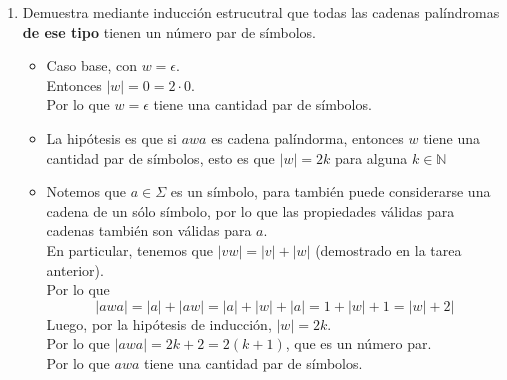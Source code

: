 \documentclass{article}
\begin{document}
\begin{enumerate}
{\begin{enumerate}
{\begin{itemize}
{                        }
                        \item {
                            Demostrar que $P(apa)$ es verdad usando la 
                            hipótesis del inciso anterior.
                        }
                    \end{itemize}
                }
                \item {
                    Demuestra mediante inducción estrucutral que todas las 
                    cadenas palíndromas \textbf{de ese tipo} tienen un número 
                    par de símbolos.
                    \begin{itemize}
                        \item {
                            Caso base, con $w = \epsilon$.\\
                            Entonces $|w| = 0 = 2\cdot 0$.\\
                            Por lo que $w = \epsilon$ tiene una cantidad par de 
                            símbolos.
                        }
                        \item {
                            La hipótesis es que si $awa$ es cadena palíndorma, 
                            entonces $w$ tiene una cantidad par de símbolos, 
                            esto es que $|w| = 2k$ para alguna $k \in \mathbb{N}$
                        }
                        \item {
                            Notemos que $a \in \Sigma$ es un símbolo, para 
                            también puede considerarse una cadena de un sólo 
                            símbolo, por lo que las propiedades válidas para 
                            cadenas también son válidas para $a$.\\
                            En particular, tenemos que $|vw| = |v| + |w|$ 
                            (demostrado en la tarea anterior).\\
                            Por lo que
                            \[|awa| = |a| + |aw| = |a| + |w| + |a| = 1 + |w| + 1
                            = |w| + 2|\]
                            Luego, por la hipótesis de inducción, $|w| = 2k$.\\
                            Por lo que $|awa| = 2k + 2 = 2 (k+1)$, que es un 
                            número par.\\
                            Por lo que $awa$ tiene una cantidad par de símbolos.                        }
                    \end{itemize}
                }
                

\end{enumerate}}
\end{enumerate}
\end{document}
